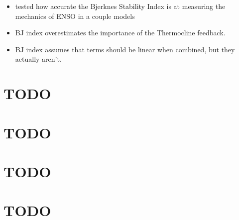 \documentclass[11pt]{article}
\begin{document}
\begin{itemize}
\item tested how accurate the Bjerknes Stability Index is at measuring the mechanics of ENSO in a couple models
\item BJ index overestimates the importance of the Thermocline feedback.
\item BJ index assumes that terms should be linear when combined, but they actually aren't.
\end{itemize}

\section{\cite{hu2018cross}}
\label{sec:org9e81eeb}
\section{\cite{jia2019weakening}}
\label{sec:orgc220f64}
\section{{\bfseries\sffamily TODO} \cite{jimenez2016record}}
\label{sec:org422a8cd}
\section{\cite{kay2015community}}
\label{sec:org5b0d352}
\section{\cite{kestin1998time}}
\label{sec:orgffee63b}
\section{{\bfseries\sffamily TODO} \cite{kim2014response}}
\label{sec:org1250259}
\section{{\bfseries\sffamily TODO} \cite{kohyama2018weakening}}
\label{sec:orgf9af32a}
\section{\cite{levine2017impact}}
\label{sec:org4982a37}
\section{\cite{lorenz1963deterministic}}
\label{sec:org5b50a4f}
\section{{\bfseries\sffamily TODO} \cite{liu2007atmospheric}}
\label{sec:org4049c31}
\end{document}
